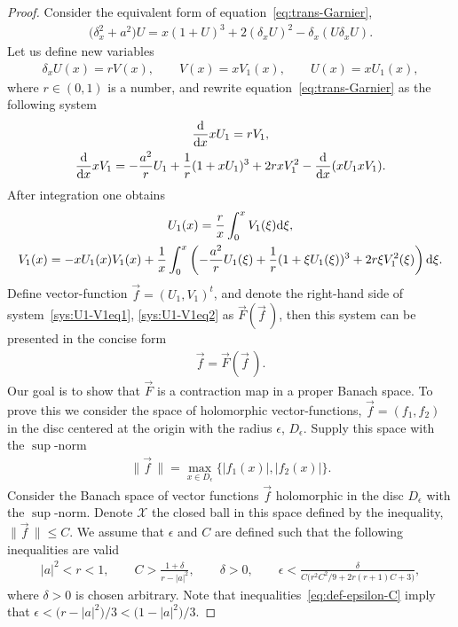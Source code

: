 \documentclass[pdftex]{sigma}
\numberwithin{equation}{section}
\begin{document}
\begin{proof}
Consider the equivalent form of equation~\eqref{eq:trans-Garnier},
\begin{gather*}
\big(\delta_x^2+a^2\big)U=x(1+U)^3+2(\delta_xU)^2-\delta_x(U\delta_xU).
\end{gather*}
Let us define new variables
\begin{gather*}
\delta_xU(x)=rV(x),\qquad V(x)=xV_1(x),\qquad U(x)=xU_1(x),
\end{gather*}
where $r\in(0,1)$ is a number,
and rewrite equation~\eqref{eq:trans-Garnier} as the following system
\begin{gather*}%
\frac{{\rm d}}{{\rm d}x}xU_1=rV_1,\\
\frac{{\rm d}}{{\rm d}x}xV_1=-\frac{a^2}{r}U_1+\frac{1}{r}(1+xU_1)^3+2rxV_1^2-\frac{{\rm d}}{{\rm d}x}(xU_1xV_1).
\end{gather*}
After integration one obtains
\begin{gather}\label{sys:U1-V1eq1}
U_1(x) =\frac{r}{x}\int_0^xV_1(\xi){\rm d}\xi,\\
V_1(x) =-xU_1(x)V_1(x)+\frac1{x}\int_0^x\left( -\frac{a^2}{r}U_1(\xi)+\frac1{r}(1+\xi U_1(\xi))^3+2r\xi V_1^2(\xi)\right){\rm d}\xi.\label{sys:U1-V1eq2}
\end{gather}
Define vector-function $\vec{f}=(U_1,V_1)^t$, and denote the right-hand side of system~\eqref{sys:U1-V1eq1},
\eqref{sys:U1-V1eq2} as $\vec{F}(\vec{f}\,)$, then this system can be presented in the concise form
\begin{gather*}
\vec{f}=\vec{F}(\vec{f}\,).
\end{gather*}
Our goal is to show that $\vec{F}$ is a contraction map in a proper Banach space.
To prove this we consider the space of holomorphic vector-functions, $\vec{f}=(f_1,f_2)$ in the disc centered
at the origin with the radius $\epsilon$, $D_{\epsilon}$. Supply this space with the $\sup$-norm
\begin{gather*}
\|\vec{f}\, \|= \max_{x\in D_{\epsilon}}\{|f_1(x)|,|f_2(x)|\} .
\end{gather*}
Consider the Banach space of vector functions $\vec f$ holomorphic in the disc $D_{\epsilon}$
with the $\sup$-norm. Denote $\mathcal{X}$ the closed ball in this space defined by the inequality,
$\|\vec{f} \,\|\leq C$. We assume that $\epsilon$ and $C$ are defined such that the following inequalities
are valid
\begin{gather}\label{eq:def-epsilon-C}
|a|^2<r<1,\qquad
C>\frac{1+\delta}{r-|a|^2},\qquad
\delta>0,\qquad
\epsilon<\frac{\delta}{C\big(r^2C^2/9+2r(r+1)C+3\big)},
\end{gather}
where $\delta>0$ is chosen arbitrary. Note that inequalities~\eqref{eq:def-epsilon-C} imply that $\epsilon<\big(r-|a|^2\big)/3<\big(1-|a|^2\big)/3$.


\end{proof}
\end{document}
